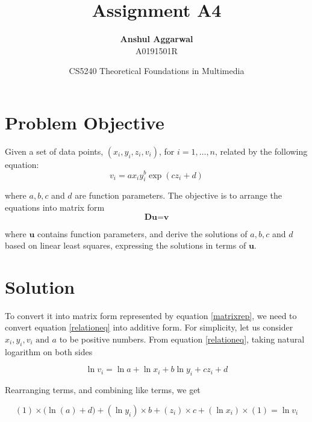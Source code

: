 \documentclass[12pt,a4paper]{article}
\title{Assignment A4}
\author{\textbf{Anshul Aggarwal}\\A0191501R}
\date{CS5240 Theoretical Foundations in Multimedia}
\begin{document}
\maketitle

\section*{Problem Objective}

Given a set of data points, $( x _ { i } , y _ { i } , z _ { i } , v _ { i })$, for $i = 1 , \dots , n$, related by the following equation:
\begin{equation}\label{relationeq}
    v _ { i } = a x _ { i } y _ { i } ^ { b } \exp \left( c z _ { i } + d \right)
\end{equation}

\noindent where $a,b,c$ and $d$ are function parameters. The objective is to arrange the equations into matrix form 
\begin{equation}\label{matrixrep}
\textbf{D} \textbf{u}=\textbf{v}
\end{equation}

\noindent where $\textbf{u}$ contains function parameters, and derive the solutions of $a,b,c$ and $d$ based on linear least squares, expressing the solutions in terms of $\textbf{u}$.

\section*{Solution}

To convert it into matrix form represented by equation \ref{matrixrep}, we need to convert equation \ref{relationeq} into additive form. For simplicity, let us consider $x_i, y_i, v_i \textrm{ and } a$ to be positive numbers. From equation \ref{relationeq}, taking natural logarithm on both sides

\begin{equation}
    \ln v_i = \ln a + \ln x_i + b\ln y_i + cz_i + d
\end{equation}

\noindent Rearranging terms, and combining like terms, we get
%

\begin{equation}
(1) \times \big(\ln(a) + d\big) + (\ln y_i) \times b + (z_i)\times c + (\ln x_i) \times (1) = \ln v_i
\end{equation}
\end{document}
